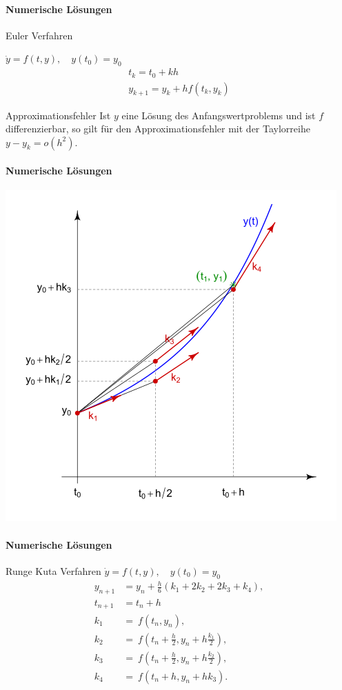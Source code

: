 \documentclass{beamer}
\begin{document}
 \begin{frame}
\framesubtitle{Numerische Lösungen}
    \begin{block}{Euler Verfahren}

$\dot{y}=f(t,y), \quad  y(t_0)=y_0$
\begin{align}
t_k=t_0+kh \\
y_{k+1}=y_k+hf(t_k,y_k)
\end{align}
    \end{block}
\begin{block}{Approximationsfehler}
    Ist $y$ eine Lösung des Anfangswertproblems und ist $f$ differenzierbar, 
    so gilt für den Approximationsfehler mit der Taylorreihe
    $y - y_{k} = o(h^2)$.
\end{block}
\end{frame}






 \begin{frame}
\framesubtitle{Numerische Lösungen}
\includegraphics[scale=0.6]{images/Runge-Kutta}

\end{frame}

 \begin{frame}
\framesubtitle{Numerische Lösungen}
    \begin{block}{Runge Kuta Verfahren}
$\dot{y}=f(t,y), \quad  y(t_0)=y_0$
\begin{align}
y_{n+1} &= y_n + \frac{h}{6}\left(k_1 + 2k_2 + 2k_3 + k_4 \right),\\
t_{n+1} &= t_n + h \\
 k_1 &= \ f(t_n, y_n), \\
 k_2 &= \ f\!\left(t_n + \frac{h}{2}, y_n + h \frac{k_1}{2}\right), \\ 
 k_3 &= \ f\!\left(t_n + \frac{h}{2}, y_n + h \frac{k_2}{2}\right), \\
 k_4 &= \ f\!\left(t_n + h, y_n + h k_3\right).
\end{align}
    \end{block}
\end{frame}
\end{document}
